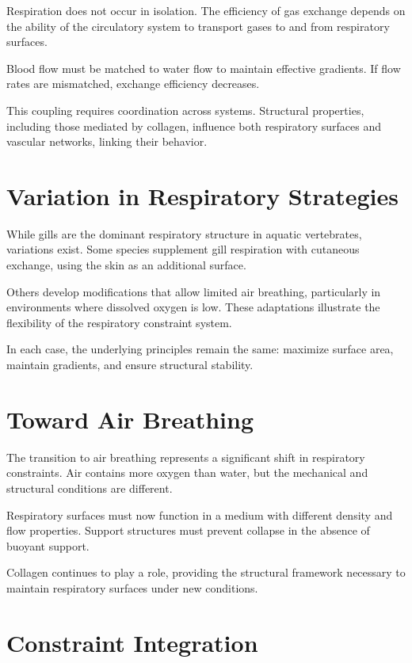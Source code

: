 \documentclass[11pt,oneside]{book}
\begin{document}
Respiration does not occur in isolation. The efficiency of gas exchange depends on the ability of the circulatory system to transport gases to and from respiratory surfaces.

Blood flow must be matched to water flow to maintain effective gradients. If flow rates are mismatched, exchange efficiency decreases.

This coupling requires coordination across systems. Structural properties, including those mediated by collagen, influence both respiratory surfaces and vascular networks, linking their behavior.

\section{Variation in Respiratory Strategies}

While gills are the dominant respiratory structure in aquatic vertebrates, variations exist. Some species supplement gill respiration with cutaneous exchange, using the skin as an additional surface.

Others develop modifications that allow limited air breathing, particularly in environments where dissolved oxygen is low. These adaptations illustrate the flexibility of the respiratory constraint system.

In each case, the underlying principles remain the same: maximize surface area, maintain gradients, and ensure structural stability.

\section{Toward Air Breathing}

The transition to air breathing represents a significant shift in respiratory constraints. Air contains more oxygen than water, but the mechanical and structural conditions are different.

Respiratory surfaces must now function in a medium with different density and flow properties. Support structures must prevent collapse in the absence of buoyant support.

Collagen continues to play a role, providing the structural framework necessary to maintain respiratory surfaces under new conditions.

\section{Constraint Integration}
\end{document}
